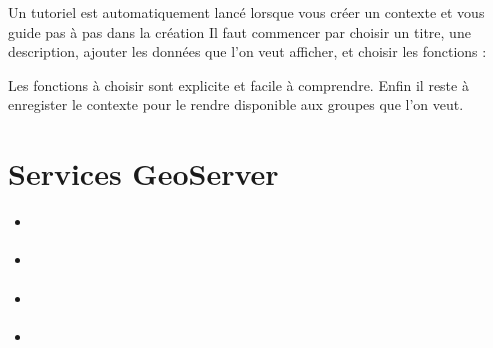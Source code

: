 \documentclass[letterpaper,10pt,french]{sphinxmanual}
\let\sphinxpxdimen\pdfpxdimen\else\newdimen\sphinxpxdimen
\begin{document}
\sphinxAtStartPar
Un tutoriel est automatiquement lancé lorsque vous créer un contexte et vous guide pas à pas dans la création
Il faut commencer par choisir un titre, une description, ajouter les données que l’on veut afficher,
et choisir les fonctions :

\noindent{\hspace*{\fill}\sphinxincludegraphics[width=600\sphinxpxdimen]{{mapstore_plugins}.png}\hspace*{\fill}}

\sphinxAtStartPar
Les fonctions à choisir sont explicite et facile à comprendre.
Enfin il reste à enregister le contexte pour le rendre disponible aux groupes que l’on veut.

\sphinxstepscope


\section{Services \sphinxhyphen{} GeoServer}
\label{\detokenize{doc_admin/services:services-geoserver}}\label{\detokenize{doc_admin/services::doc}}
\begin{sphinxShadowBox}
\begin{itemize}
\item {} 
\sphinxAtStartPar
{}\label{\detokenize{doc_admin/services:id1}}{\hyperref[\detokenize{doc_admin/services:introduction}]{}}

\item {} 
\sphinxAtStartPar
{}\label{\detokenize{doc_admin/services:id2}}{\hyperref[\detokenize{doc_admin/services:les-donnees-stockees-en-interne}]{}}

\item {} 
\sphinxAtStartPar
{}\label{\detokenize{doc_admin/services:id3}}{\hyperref[\detokenize{doc_admin/services:la-diffusion-des-donnees-avec-les-flux-ogc}]{}}

\item {} 
\sphinxAtStartPar
{}\label{\detokenize{doc_admin/services:id4}}{\hyperref[\detokenize{doc_admin/services:la-restriction-d-acces-aux-donnees}]{}}

\end{itemize}
\end{sphinxShadowBox}
\end{document}
